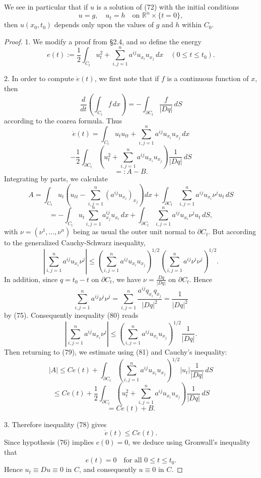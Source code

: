 \begin{remark}
\label{rem:hyperbolic-finite-propagation-remark}
We see in particular that if $u$ is a solution of (72) with the initial conditions
\[
u = g, \quad u_t = h \quad \text{on } \mathbb{R}^n \times \{t = 0\},
\tag{77}
\]
then $u(x_0, t_0)$ depends only upon the values of $g$ and $h$ within $C_0$.
\end{remark}

\begin{proof}
1. We modify a proof from \S2.4, and so define the energy
\[
e(t) := \frac{1}{2}\int_{C_t} u_t^2 + \sum_{i,j=1}^n a^{ij}u_{x_i}u_{x_j} \, dx \quad (0 \le t \le t_0).
\]

2. In order to compute $\dot{e}(t)$, we first note that if $f$ is a continuous function of $x$, then
\[
\frac{d}{dt}\left(\int_{C_t} f\,dx\right) = -\int_{\partial C_t} \frac{f}{|Dq|}\,dS
\]
according to the coarea formula. Thus
\[
\dot{e}(t) = \int_{C_t} u_t u_{tt} + \sum_{i,j=1}^{n} a^{ij} u_{x_i} u_{x_j}\,dx
\]
\[
- \frac{1}{2}\int_{\partial C_t} \left(u_t^2 + \sum_{i,j=1}^{n} a^{ij} u_{x_i} u_{x_j}\right) \frac{1}{|Dq|}\,dS
\tag{78}
\]
\[
=: A - B.
\]
Integrating by parts, we calculate
\[
A = \int_{C_t} u_t\left(u_{tt} - \sum_{i,j=1}^{n} (a^{ij} u_{x_i})_{x_j}\right)dx + \int_{\partial C_t} \sum_{i,j=1}^{n} a^{ij} u_{x_i} \nu^j u_t\,dS
\]
\[
= -\int_{C_t} u_t \sum_{i,j=1}^{n} a^{ij}_{x_j} u_{x_i}\,dx + \int_{\partial C_t} \sum_{i,j=1}^{n} a^{ij} u_{x_i} \nu^j u_t\,dS,
\tag{79}
\]
with $\nu = (\nu^1, \ldots, \nu^n)$ being as usual the outer unit normal to $\partial C_t$. But according to the generalized Cauchy-Schwarz inequality,
\[
\left|\sum_{i,j=1}^{n} a^{ij} u_{x_i} \nu^j\right| \le \left(\sum_{i,j=1}^{n} a^{ij} u_{x_i} u_{x_j}\right)^{1/2} \left(\sum_{i,j=1}^{n} a^{ij} \nu^i \nu^j\right)^{1/2}.
\tag{80}
\]
In addition, since $q = t_0 - t$ on $\partial C_t$, we have $\nu = \frac{Dq}{|Dq|}$ on $\partial C_t$. Hence
\[
\sum_{i,j=1}^{n} a^{ij} \nu^i \nu^j = \sum_{i,j=1}^{n} \frac{a^{ij} q_{x_i} q_{x_j}}{|Dq|^2} = \frac{1}{|Dq|^2}
\]
by (75). Consequently inequality (80) reads
\[
\left|\sum_{i,j=1}^{n} a^{ij} u_{x_i} \nu^j\right| \le \left(\sum_{i,j=1}^{n} a^{ij} u_{x_i} u_{x_j}\right)^{1/2} \frac{1}{|Dq|}.
\tag{81}
\]
Then returning to (79), we estimate using (81) and Cauchy's inequality:
\[
|A| \le Ce(t) + \int_{\partial C_t} \left(\sum_{i,j=1}^{n} a^{ij} u_{x_i} u_{x_j}\right)^{1/2} |u_t| \frac{1}{|Dq|}\,dS
\]
\[
\le Ce(t) + \frac{1}{2}\int_{\partial C_t}\left(u_t^2 + \sum_{i,j=1}^{n} a^{ij} u_{x_i} u_{x_j}\right) \frac{1}{|Dq|}\,dS
\]
\[
= Ce(t) + B.
\]

3. Therefore inequality (78) gives
\[
\dot{e}(t) \leq Ce(t).
\]
Since hypothesis (76) implies $e(0) = 0$, we deduce using Gronwall's inequality that
\[
e(t) = 0 \quad \text{for all } 0 \leq t \leq t_0.
\]
Hence $u_t \equiv Du \equiv 0$ in $C$, and consequently $u \equiv 0$ in $C$.
\end{proof}

